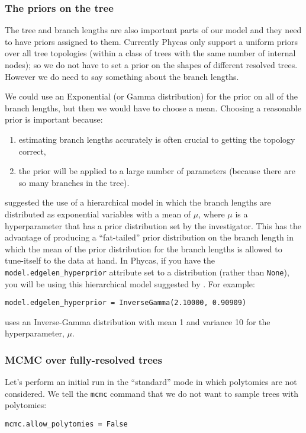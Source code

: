 \documentclass{article}
\newcommand{\cmd}[1]{\texttt{#1}\xspace}
\newcommand{\phycas}{Phycas\xspace}
\begin{document}
\subsubsection{The priors on the tree}
The tree and branch lengths are also important parts of our model and they need to have
priors assigned to them.
Currently \phycas only support a uniform priors over all tree topologies (within a
class of trees with the same number of internal nodes); so we do not have to set
a prior on the shapes of different resolved trees.
However we do need to say something about the branch lengths.

We could use an Exponential (or Gamma distribution) for the prior on all of the branch lengths, but then we would have to choose a mean.
Choosing a reasonable prior is important because:
\begin{enumerate}
	\item  estimating branch lengths accurately is often crucial to getting the topology correct,
	\item the prior will be applied to a large number of parameters (because there are so many branches in the tree).
\end{enumerate}
\citet{SuchardWS2001} suggested the use of a hierarchical model in which the branch lengths are distributed as exponential variables with a mean of $\mu$, where $\mu$ is a hyperparameter that 
has a prior distribution set by the investigator.
This has the advantage of producing a ``fat-tailed'' prior distribution on the branch length in which the 
mean of the prior distribution for the branch lengths is allowed to tune-itself to the data at hand.
In \phycas, if you have the \cmd{model.edgelen\_hyperprior} attribute set to a distribution (rather than \texttt{None}), you will be using this hierarchical model suggested by \citet{SuchardWS2001}.
For example:
\begin{verbatim}
model.edgelen_hyperprior = InverseGamma(2.10000, 0.90909)
\end{verbatim}
uses an Inverse-Gamma distribution with mean 1 and variance 10 for the hyperparameter, $\mu$.

\subsubsection{MCMC over fully-resolved trees}
Let's perform an initial run in the ``standard'' mode in which polytomies are not considered.
We tell the \cmd{mcmc} command that we do not want to sample trees with polytomies:
\begin{verbatim}
mcmc.allow_polytomies = False
\end{verbatim}
\end{document}
